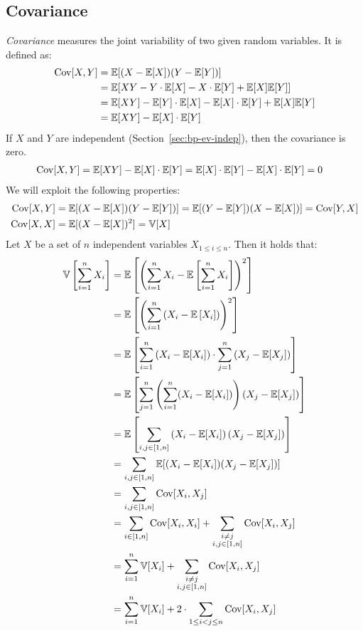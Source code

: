 \subsection{Covariance}
\label{sec:covar}
%
\emph{Covariance} measures the joint variability of two given random variables.
It is defined as:
\begin{align}
  \operatorname{Cov}[X,Y]
    &= \mathbb E[(X - \mathbb E[X])(Y - \mathbb E[Y])] \label{eq:cov}\\
    &= \mathbb E[XY - Y\cdot\mathbb E[X] - X\cdot\mathbb E[Y] + \mathbb E[X]\mathbb E[Y]] \notag\\
    &= \mathbb E[XY] - \mathbb E[Y]\cdot\mathbb E[X] - \mathbb E[X]\cdot\mathbb E[Y] + \mathbb E[X]\mathbb E[Y] \notag\\
    &= \mathbb E[XY] - \mathbb E[X]\cdot\mathbb E[Y] \label{eq:cov-exy}
\end{align}
%
If $X$ and $Y$ are independent (Section~\ref{sec:bp-ev-indep}), then the covariance is zero.
\begin{align}
  \operatorname{Cov}[X,Y] &= \mathbb E[XY] - \mathbb E[X] \cdot \mathbb E[Y] = \mathbb E[X] \cdot \mathbb E[Y] - \mathbb E[X] \cdot \mathbb E[Y] = 0 \label{eq:CovXY0}
\end{align}
We will exploit the following properties:
\begin{align}
  \operatorname{Cov}[X,Y] &= \mathbb E[(X - \mathbb E[X])(Y - \mathbb E[Y])] = \mathbb E[(Y - \mathbb E[Y])(X - \mathbb E[X])] = \operatorname{Cov}[Y,X] \\
  \operatorname{Cov}[X,X] &= \mathbb E[(X - \mathbb E[X])^2] = \mathbb V[X]
\end{align}
%
Let $X$ be a set of $n$ independent variables $X_{1 \leq i \leq n}$.
Then it holds that:
\begin{align}
  \mathbb V\left[\sum_{i=1}^n X_i\right]
    &= \mathbb E\left[\left(\sum_{i=1}^n X_i - \mathbb E\left[\sum_{i=1}^n X_i\right]\right)^2\right] \notag \\
    &= \mathbb E\left[\left(\sum_{i=1}^n \left(X_i - \mathbb E\left[X_i\right]\right)\right)^2\right] \notag \\
    &= \mathbb E\left[\sum_{i=1}^n \left(X_i - \mathbb E[X_i]\right) \cdot \sum_{j=1}^n \left(X_j - \mathbb E[X_j]\right)\right] \notag \\
    &= \mathbb E\left[\sum_{j=1}^n \left(\sum_{i=1}^n (X_i - \mathbb E[X_i])\right) (X_j - \mathbb E[X_j]) \right] \notag \\
    &= \mathbb E\left[\sum_{i,j \in [1,n]} \left(X_i - \mathbb E[X_i]\right) \left(X_j - \mathbb E[X_j]\right)\right] \notag \\
    &= \sum_{i,j \in [1,n]} \mathbb E[(X_i - \mathbb E[X_i])(X_j - \mathbb E[X_j])] \notag \\
    &= \sum_{i,j \in [1,n]} \operatorname{Cov}[X_i, X_j] \notag \\
    &= \sum_{i \in [1,n]} \operatorname{Cov}[X_i, X_i] + \sum_{\substack{i \neq j \\ i,j \in [1,n]}} \operatorname{Cov}[X_i, X_j] \notag \\
    &= \sum_{i=1}^n \mathbb V[X_i] + \sum_{\substack{i \neq j \\ i,j \in [1,n]}} \operatorname{Cov}[X_i, X_j] \notag \\
    &= \sum_{i=1}^n \mathbb V[X_i] + 2 \cdot \sum_{1 \leq i < j \leq n} \operatorname{Cov}[X_i, X_j] \label{eq:sumVarCov}
\end{align}

